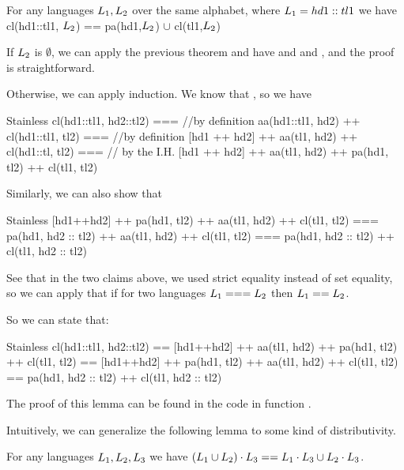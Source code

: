 \begin{lemma}
	\label{lem:clInductLeft}
	For any languages $L_{1}, L_{2}$ over the same alphabet, where $L_{1} = hd1::tl1$ we have
	cl(hd1::tl1, $ L_{2}$) == pa(hd1,$ L_{2}$) $\cup$ cl(tl1,$ L_{2}$)
\end{lemma}

If $ L_{2}$ is $\emptyset$, we can apply the previous theorem and have  and \inline{ [pa(hd,$\emptyset$)] = $\emptyset$  } and , and the proof is straightforward.

Otherwise, we can apply induction. We know that , so we have

\begin{ShortCode}{Stainless}
 cl(hd1::tl1, hd2::tl2) === 
 //by definition
 aa(hd1::tl1, hd2) ++ cl(hd1::tl1, tl2) === 
 //by definition
 [hd1 ++ hd2] ++ aa(tl1, hd2) ++ cl(hd1::tl, tl2)  === 
 // by the I.H.
 [hd1 ++ hd2] ++ aa(tl1, hd2) ++ pa(hd1, tl2) ++ cl(tl1, tl2)
\end{ShortCode} 

Similarly, we can also show that 

\begin{ShortCode}{Stainless}
 [hd1++hd2] ++ pa(hd1, tl2) ++ aa(tl1, hd2) ++ cl(tl1, tl2) ===
 pa(hd1, hd2 :: tl2) ++ aa(tl1, hd2) ++ cl(tl1, tl2) ===
 pa(hd1, hd2 :: tl2) ++ cl(tl1, hd2 :: tl2)
\end{ShortCode} 

See that in the two claims above, we used strict equality instead of set equality, so we can apply that if for two languages $L_{1} === L_{2}$ then $L_{1} == L_{2}$.

So we can state that:

\begin{ShortCode}{Stainless}
 cl(hd1::tl1, hd2::tl2) ==
 [hd1++hd2] ++ aa(tl1, hd2) ++ pa(hd1, tl2) ++ cl(tl1, tl2) ==
 [hd1++hd2] ++ pa(hd1, tl2) ++  aa(tl1, hd2) ++ cl(tl1, tl2) ==
 pa(hd1, hd2 :: tl2) ++ cl(tl1, hd2 :: tl2)
\end{ShortCode}

The proof of this lemma can be found in the code in function .

Intuitively, we can generalize the following lemma to some kind of distributivity.

\begin{lemma}
	\label{lem:clLeftDistributiveAppend}
	For any languages $L_{1}, L_{2}, L_{3}$ we have $(L_{1} \cup L_{2}) \cdot L_{3} == L_{1} \cdot L_{3} \cup L_{2} \cdot L_{3}$.
\end{lemma}

